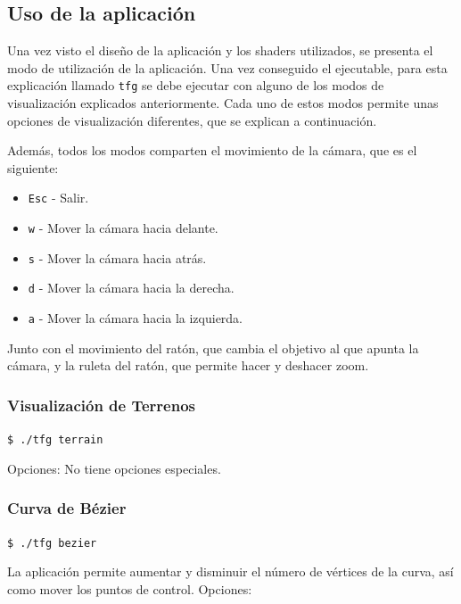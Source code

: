 \subsection{Uso de la aplicación}
\label{subsection:uso}

Una vez visto el diseño de la aplicación y los shaders utilizados, se presenta
el modo de utilización de la aplicación. Una vez conseguido el ejecutable, para
esta explicación llamado \verb|tfg| se debe ejecutar con alguno de los modos de
visualización explicados anteriormente. Cada uno de estos modos permite unas
opciones de visualización diferentes, que se explican a continuación.

Además, todos los modos comparten el movimiento de la cámara, que es el
siguiente:

\begin{itemize}
		\item \verb|Esc| - Salir.
		\item \verb|w| - Mover la cámara hacia delante.
		\item \verb|s| - Mover la cámara hacia atrás.
		\item \verb|d| - Mover la cámara hacia la derecha.
		\item \verb|a| - Mover la cámara hacia la izquierda.
\end{itemize}

Junto con el movimiento del ratón, que cambia el objetivo al que apunta la
cámara, y la ruleta del ratón, que permite hacer y deshacer zoom.

\subsubsection{Visualización de Terrenos}

\verb|$ ./tfg terrain|

Opciones: No tiene opciones especiales.

\subsubsection{Curva de Bézier}

\verb|$ ./tfg bezier|

La aplicación permite aumentar y disminuir el número de vértices de la curva,
así como mover los puntos de control.
Opciones:

